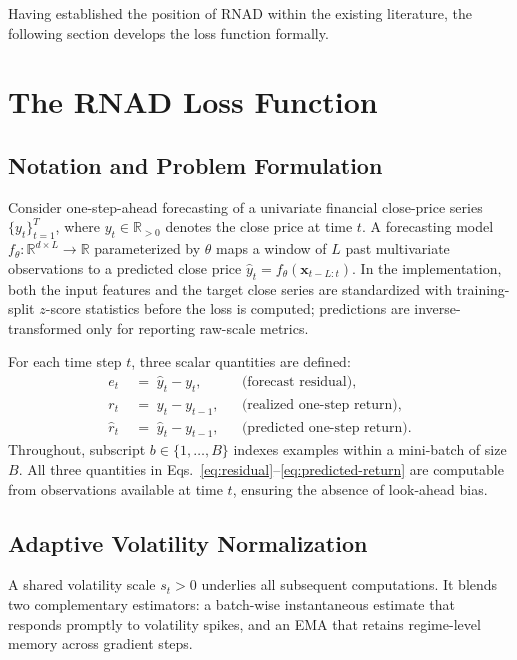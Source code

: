 \documentclass[11pt]{article}
\newcommand{\RNAD}{RNAD\xspace}
\begin{document}
Having established the position of \RNAD within the existing
literature, the following section develops the loss function
formally.

\FloatBarrier
\section{The \RNAD Loss Function}
\label{sec:method}

\subsection{Notation and Problem Formulation}

Consider one-step-ahead forecasting of a univariate financial
close-price series $\{y_t\}_{t=1}^{T}$, where $y_t \in \mathbb{R}_{>0}$
denotes the close price at time $t$. A forecasting model
$f_\theta : \mathbb{R}^{d \times L} \to \mathbb{R}$ parameterized by
$\theta$ maps a window of $L$ past multivariate observations to a
predicted close price $\hat{y}_t = f_\theta(\mathbf{x}_{t-L:t})$.
In the implementation, both the input features and the target close
series are standardized with training-split $z$-score statistics
before the loss is computed; predictions are inverse-transformed only
for reporting raw-scale metrics.

For each time step $t$, three scalar quantities are defined:
\begin{align}
  e_t     &\;=\; \hat{y}_t - y_t,
          && \text{(forecast residual),}
  \label{eq:residual}\\
  r_t     &\;=\; y_t - y_{t-1},
          && \text{(realized one-step return),}
  \label{eq:realized}\\
  \hat{r}_t &\;=\; \hat{y}_t - y_{t-1},
          && \text{(predicted one-step return).}
  \label{eq:predicted-return}
\end{align}
Throughout, subscript $b \in \{1,\ldots,B\}$ indexes examples within
a mini-batch of size $B$. All three quantities in
Eqs.~\eqref{eq:residual}--\eqref{eq:predicted-return} are computable
from observations available at time $t$, ensuring the absence of
look-ahead bias.

\subsection{Adaptive Volatility Normalization}
\label{ssec:normalization}

A shared volatility scale $s_t > 0$ underlies all subsequent
computations. It blends two complementary estimators: a batch-wise
instantaneous estimate that responds promptly to volatility spikes,
and an EMA that retains regime-level memory across gradient steps.
\end{document}
